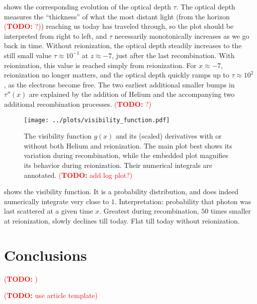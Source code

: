 \documentclass[10pt,a4paper]{article}
\newcommand\TODO[1]{\textcolor{red}{(\textbf{TODO:} #1)}}
\begin{document}
 shows the corresponding evolution of the optical depth $\tau$.
The optical depth measures the ``thickness'' of what the most distant light (from the horizon \TODO{?}) reaching us today has traveled through,
so the plot should be interpreted from right to left, and $\tau$ necessarily monotonically increases as we go back in time.
Without reionization, the optical depth steadily increases to the still small value $\tau \approx 10^{-1}$ at $z \approx -7$, just after the last recombination.
With reionization, this value is reached simply from reionization.
For $x \approx -7$, reionization no longer matters, and the optical depth quickly ramps up to $\tau \approx 10^{2}$, as the electrons become free.
The two earliest additional smaller bumps in $\tau''(x)$ are explained by the addition of Helium and the accompanying two additional recombination processes. \TODO{?}

\begin{figure}
	\centering
	\texttt{[image: ../plots/visibility\_function.pdf]}
	\caption{The visibility function $g(x)$ and its (scaled) derivatives with or without both Helium and reionization. The main plot best shows its variation during recombination, while the embedded plot magnifies its behavior during reionization. Their numerical integrals are annotated. \TODO{add log plot?}}
	\label{fig_visibility_function}
\end{figure}

 shows the visibility function.
It is a probability distribution, and does indeed numerically integrate very close to $1$.
Interpretation: probability that photon was last scattered at a given time $x$.
Greatest during recombination, $50$ times smaller at reionization, slowly declines till today.
Flat till today without reionization.

\clearpage
\section{Conclusions}

\TODO{}

\TODO{use article template}

%
\printbibliography
\end{document}
